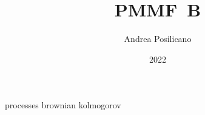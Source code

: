 \usepackage	{PMMF-style/style}

\title	{PMMF~B}
\author	{Andrea Posilicano}
\date	{2022}


\maketitle
	{processes}
	{brownian}
\appendix
	{kolmogorov}

